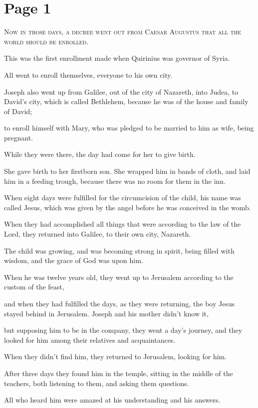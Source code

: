 \chapterornament
\section*{Page 1}

\lettrine{N}{ow in those days, a decree went out from Caesar Augustus that all the world should be enrolled.}

This was the first enrollment made when Quirinius was governor of Syria.

All went to enroll themselves, everyone to his own city.

Joseph also went up from Galilee, out of the city of Nazareth, into Judea, to David’s city, which is called Bethlehem, because he was of the house and family of David;

to enroll himself with Mary, who was pledged to be married to him as wife, being pregnant.

While they were there, the day had come for her to give birth.

She gave birth to her firstborn son. She wrapped him in bands of cloth, and laid him in a feeding trough, because there was no room for them in the inn.

When eight days were fulfilled for the circumcision of the child, his name was called Jesus, which was given by the angel before he was conceived in the womb.

When they had accomplished all things that were according to the law of the Lord, they returned into Galilee, to their own city, Nazareth.

The child was growing, and was becoming strong in spirit, being filled with wisdom, and the grace of God was upon him.

When he was twelve years old, they went up to Jerusalem according to the custom of the feast,

and when they had fulfilled the days, as they were returning, the boy Jesus stayed behind in Jerusalem. Joseph and his mother didn’t know it,

but supposing him to be in the company, they went a day’s journey, and they looked for him among their relatives and acquaintances.

When they didn’t find him, they returned to Jerusalem, looking for him.

After three days they found him in the temple, sitting in the middle of the teachers, both listening to them, and asking them questions.

All who heard him were amazed at his understanding and his answers.

